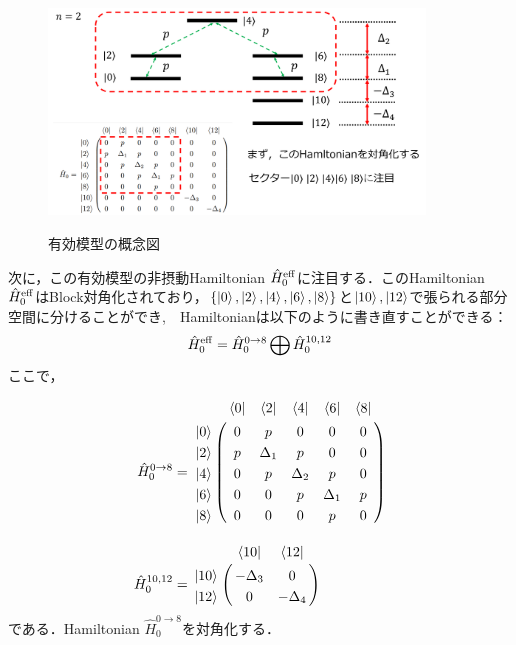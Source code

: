 \subsection{}
\begin{figure}[h]
\centering
		\includegraphics[width=10cm]{file/fig/effective_0and8/KPO_effective_0and8_1.png} \\
\caption{有効模型の概念図}
\label{fig:kpo_effective_0and8_1}
\end{figure}
次に，この有効模型の非摂動Hamiltonian $\hat{H}_0^{\rm{eff}}$に注目する．このHamiltonian $\hat{H}_0^{\rm{eff}}$はBlock対角化されており，$\{\ket{0}, \ket{2}, \ket{4}, \ket{6}, \ket{8}\}$と$\ket{10}, \ket{12}$で張られる部分空間に分けることができ,　Hamiltonianは以下のように書き直すことができる：
\begin{equation}
    \hat{H}_0^{\rm{eff}}
    =\hat{H}_0^{0\to8} \bigoplus \hat{H}_0^{10,12}
\end{equation}
ここで，
    
\begin{align}
    \hat{H}_0^{0\to8}&=\bordermatrix{
    & \bra{0} &  \bra{2} &  \bra{4}&  \bra{6}&  \bra{8}\cr
   \ket{0}&0&p&0&0&0\cr
  \ket{2}&p&\Delta_1&p&0&0\cr
  \ket{4}&0&p&\Delta_2&p&0\cr
  \ket{6}&0&0&p&\Delta_1&p\cr
  \ket{8}&0&0&0&p&0\cr
  }\\[10pt]
  \hat{H}_0^{10,12}&=
   \bordermatrix{     
    & \bra{10} &\bra{12}\cr
   \ket{10}&-\Delta_3&0\cr
  \ket{12}&0&-\Delta_4\cr}
\end{align}
である．Hamiltonian $\hat{H}_0^{0\to8}$を対角化する．

